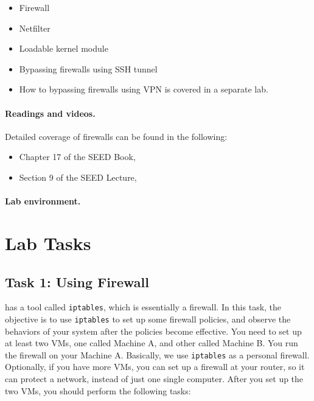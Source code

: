 \begin{itemize}[noitemsep]
\item Firewall
\item Netfilter
\item Loadable kernel module
\item Bypassing firewalls using SSH tunnel 
\item How to bypassing firewalls using VPN is covered in a separate lab.
\end{itemize}


\paragraph{Readings and videos.}
Detailed coverage of firewalls can be found in the following:

\begin{itemize}
\item Chapter 17 of the SEED Book, \seedbook
\item Section 9 of the SEED Lecture, \seedisvideo
\end{itemize}


\paragraph{Lab environment.} \seedenvironment



\section{Lab Tasks}



\subsection{Task 1: Using Firewall}

\linux has a tool called {\tt iptables}, which is essentially a firewall.
In this task, the objective is to use {\tt iptables} to set up some firewall policies, and 
observe the behaviors of your system after the policies become effective.
You need to set up at least two VMs, one called Machine A, and other called 
Machine B. You run the firewall on your Machine A. Basically, we use 
{\tt iptables} as a personal firewall. Optionally, if you have more VMs, you can 
set up a firewall at your router, so it can protect a network, instead of 
just one single computer. After you set up the two VMs, you should perform
the following tasks: 

